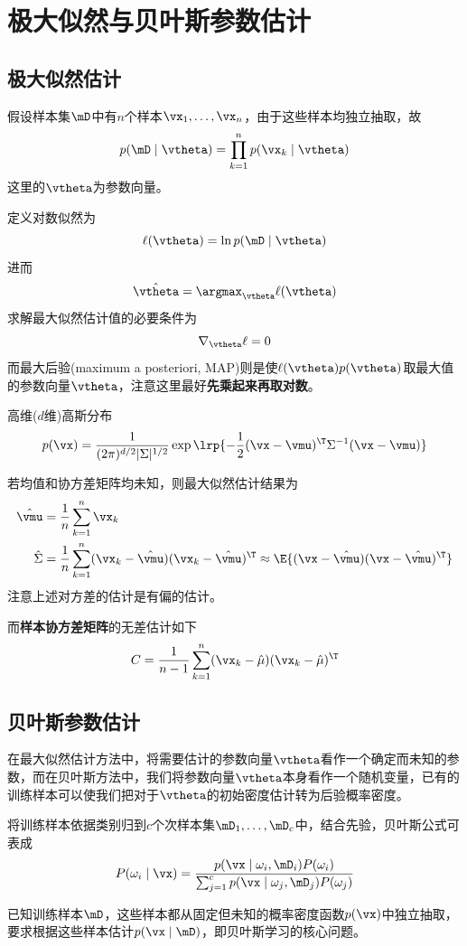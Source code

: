 
\section{极大似然与贝叶斯参数估计} %
\subsection{极大似然估计}
假设样本集$\mD$中有$n$个样本$\vx_1,\ldots,\vx_n$，由于这些样本均独立抽取，故
\[p(\mD\mid\vtheta)=\prod_{k=1}^np(\vx_k\mid\vtheta)\]
这里的$\vtheta$为参数向量。

定义对数似然为
\[\ell(\vtheta)=\ln p(\mD\mid\vtheta)\]
进而
\[\hat{\vtheta}=\argmax_{\vtheta}\ell(\vtheta)\]
求解最大似然估计值的必要条件为
\[\nabla_{\vtheta}\ell = 0\]
而最大后验(maximum a posteriori, MAP)则是使$\ell(\vtheta)p(\vtheta)$取最大值的参数向量$\vtheta$，注意这里最好\textbf{先乘起来再取对数}。

高维($d$维)高斯分布
\[p(\vx)=\frac{1}{(2\pi)^{d/2}|\Sigma|^{1/2}}\exp\lrp{-\frac{1}{2}(\vx-\vmu)^\T\Sigma^{-1}(\vx-\vmu)}\]

若均值和协方差矩阵均未知，则最大似然估计结果为
\[\begin{aligned}
\hat{\vmu} &= \frac{1}{n}\sum_{k=1}^n\vx_k\\
\hat{\Sigma} &= \frac{1}{n}\sum_{k=1}^n(\vx_k-\hat{\vmu})(\vx_k-\hat{\vmu})^\T\approx\E{(\vx-\hat{\vmu})(\vx-\hat{\vmu})^\T}
\end{aligned}\]
注意上述对方差的估计是有偏的估计。

而\textbf{样本协方差矩阵}的无差估计如下
\[C=\frac{1}{n-1}\sum_{k=1}^n(\vx_k-\hat{\mu})(\vx_k-\hat{\mu})^\T\]

\subsection{贝叶斯参数估计}
在最大似然估计方法中，将需要估计的参数向量$\vtheta$看作一个确定而未知的参数，而在贝叶斯方法中，我们将参数向量$\vtheta$本身看作一个随机变量，已有的训练样本可以使我们把对于$\vtheta$的初始密度估计转为后验概率密度。

将训练样本依据类别归到$c$个次样本集$\mD_1,\ldots,\mD_c$中，结合先验，贝叶斯公式可表成
\[P(\omega_i\mid\vx)=\frac{p(\vx\mid\omega_i,\mD_i)P(\omega_i)}{\sum_{j=1}^cp(\vx\mid\omega_j,\mD_j)P(\omega_j)}\]

已知训练样本$\mD$，这些样本都从固定但未知的概率密度函数$p(\vx)$中独立抽取，要求根据这些样本估计$p(\vx\mid\mD)$，即贝叶斯学习的核心问题。

